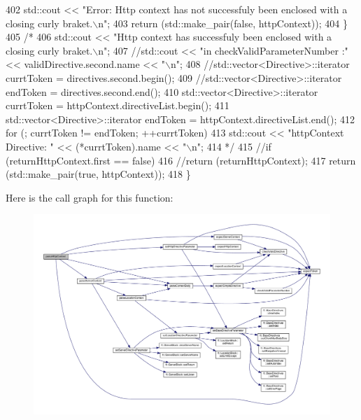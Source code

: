 \begin{DoxyCode}
402             std::cout << \textcolor{stringliteral}{"Error: Http context has not successfuly been enclosed with a closing curly
       braket.\(\backslash\)n"};
403             \textcolor{keywordflow}{return} (std::make\_pair(\textcolor{keyword}{false}, httpContext));
404         \}
405 \textcolor{comment}{/*}
406 \textcolor{comment}{        std::cout << "Http context has successfuly been enclosed with a closing curly braket.\(\backslash\)n";}
407 \textcolor{comment}{        //std::cout << "in checkValidParameterNumber :" << validDirective.second.name << "\(\backslash\)n";}
408 \textcolor{comment}{        //std::vector<Directive>::iterator  currtToken = directives.second.begin();}
409 \textcolor{comment}{        //std::vector<Directive>::iterator  endToken = directives.second.end();}
410 \textcolor{comment}{        std::vector<Directive>::iterator    currtToken = httpContext.directiveList.begin();}
411 \textcolor{comment}{        std::vector<Directive>::iterator    endToken = httpContext.directiveList.end();}
412 \textcolor{comment}{        for (; currtToken != endToken; ++currtToken)}
413 \textcolor{comment}{            std::cout << "httpContext Directive: " << (*currtToken).name << "\(\backslash\)n";}
414 \textcolor{comment}{*/}          
415         \textcolor{comment}{//if (returnHttpContext.first == false)}
416         \textcolor{comment}{//return (returnHttpContext);}
417         \textcolor{keywordflow}{return} (std::make\_pair(\textcolor{keyword}{true}, httpContext));
418     \}
\end{DoxyCode}
Here is the call graph for this function\+:
\nopagebreak
\begin{figure}[H]
\begin{center}
\leavevmode
\includegraphics[width=350pt]{classft_1_1_parser_a17a213759b2cca8e91ca225b2e86739d_cgraph}
\end{center}
\end{figure}
